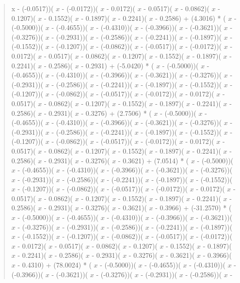 \documentclass[a4paper, 12pt]{article}
\begin{document}
\begin{quote}
x \)  - (-0.0517))( \( x \)  - (-0.0172))( \( x \)  - 0.0172)( \( x \)  - 0.0517)( \( x \)  - 0.0862)( \( x \)  - 0.1207)( \( x \)  - 0.1552)( \( x \)  - 0.1897)( \( x \)  - 0.2241)( \( x \)  - 0.2586) + (4.3016) * ( \( x \)  - (-0.5000))( \( x \)  - (-0.4655))( \( x \)  - (-0.4310))( \( x \)  - (-0.3966))( \( x \)  - (-0.3621))( \( x \)  - (-0.3276))( \( x \)  - (-0.2931))( \( x \)  - (-0.2586))( \( x \)  - (-0.2241))( \( x \)  - (-0.1897))( \( x \)  - (-0.1552))( \( x \)  - (-0.1207))( \( x \)  - (-0.0862))( \( x \)  - (-0.0517))( \( x \)  - (-0.0172))( \( x \)  - 0.0172)( \( x \)  - 0.0517)( \( x \)  - 0.0862)( \( x \)  - 0.1207)( \( x \)  - 0.1552)( \( x \)  - 0.1897)( \( x \)  - 0.2241)( \( x \)  - 0.2586)( \( x \)  - 0.2931) + (-5.0420) * ( \( x \)  - (-0.5000))( \( x \)  - (-0.4655))( \( x \)  - (-0.4310))( \( x \)  - (-0.3966))( \( x \)  - (-0.3621))( \( x \)  - (-0.3276))( \( x \)  - (-0.2931))( \( x \)  - (-0.2586))( \( x \)  - (-0.2241))( \( x \)  - (-0.1897))( \( x \)  - (-0.1552))( \( x \)  - (-0.1207))( \( x \)  - (-0.0862))( \( x \)  - (-0.0517))( \( x \)  - (-0.0172))( \( x \)  - 0.0172)( \( x \)  - 0.0517)( \( x \)  - 0.0862)( \( x \)  - 0.1207)( \( x \)  - 0.1552)( \( x \)  - 0.1897)( \( x \)  - 0.2241)( \( x \)  - 0.2586)( \( x \)  - 0.2931)( \( x \)  - 0.3276) + (2.7506) * ( \( x \)  - (-0.5000))( \( x \)  - (-0.4655))( \( x \)  - (-0.4310))( \( x \)  - (-0.3966))( \( x \)  - (-0.3621))( \( x \)  - (-0.3276))( \( x \)  - (-0.2931))( \( x \)  - (-0.2586))( \( x \)  - (-0.2241))( \( x \)  - (-0.1897))( \( x \)  - (-0.1552))( \( x \)  - (-0.1207))( \( x \)  - (-0.0862))( \( x \)  - (-0.0517))( \( x \)  - (-0.0172))( \( x \)  - 0.0172)( \( x \)  - 0.0517)( \( x \)  - 0.0862)( \( x \)  - 0.1207)( \( x \)  - 0.1552)( \( x \)  - 0.1897)( \( x \)  - 0.2241)( \( x \)  - 0.2586)( \( x \)  - 0.2931)( \( x \)  - 0.3276)( \( x \)  - 0.3621) + (7.0514) * ( \( x \)  - (-0.5000))( \( x \)  - (-0.4655))( \( x \)  - (-0.4310))( \( x \)  - (-0.3966))( \( x \)  - (-0.3621))( \( x \)  - (-0.3276))( \( x \)  - (-0.2931))( \( x \)  - (-0.2586))( \( x \)  - (-0.2241))( \( x \)  - (-0.1897))( \( x \)  - (-0.1552))( \( x \)  - (-0.1207))( \( x \)  - (-0.0862))( \( x \)  - (-0.0517))( \( x \)  - (-0.0172))( \( x \)  - 0.0172)( \( x \)  - 0.0517)( \( x \)  - 0.0862)( \( x \)  - 0.1207)( \( x \)  - 0.1552)( \( x \)  - 0.1897)( \( x \)  - 0.2241)( \( x \)  - 0.2586)( \( x \)  - 0.2931)( \( x \)  - 0.3276)( \( x \)  - 0.3621)( \( x \)  - 0.3966) + (-31.2570) * ( \( x \)  - (-0.5000))( \( x \)  - (-0.4655))( \( x \)  - (-0.4310))( \( x \)  - (-0.3966))( \( x \)  - (-0.3621))( \( x \)  - (-0.3276))( \( x \)  - (-0.2931))( \( x \)  - (-0.2586))( \( x \)  - (-0.2241))( \( x \)  - (-0.1897))( \( x \)  - (-0.1552))( \( x \)  - (-0.1207))( \( x \)  - (-0.0862))( \( x \)  - (-0.0517))( \( x \)  - (-0.0172))( \( x \)  - 0.0172)( \( x \)  - 0.0517)( \( x \)  - 0.0862)( \( x \)  - 0.1207)( \( x \)  - 0.1552)( \( x \)  - 0.1897)( \( x \)  - 0.2241)( \( x \)  - 0.2586)( \( x \)  - 0.2931)( \( x \)  - 0.3276)( \( x \)  - 0.3621)( \( x \)  - 0.3966)( \( x \)  - 0.4310) + (78.0024) * ( \( x \)  - (-0.5000))( \( x \)  - (-0.4655))( \( x \)  - (-0.4310))( \( x \)  - (-0.3966))( \( x \)  - (-0.3621))( \( x \)  - (-0.3276))( \( x \)  - (-0.2931))( \( x \)  - (-0.2586))( \( x \)  - 
\end{quote}
\end{document}
